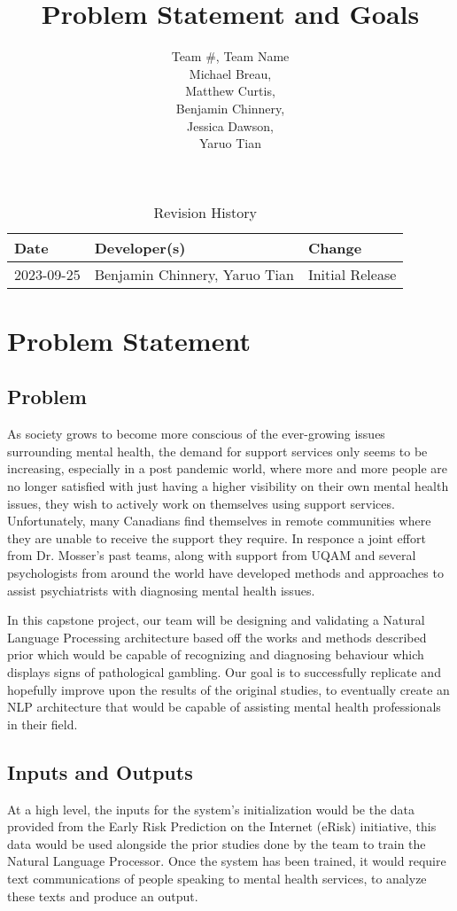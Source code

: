 \documentclass{article}
\title{Problem Statement and Goals\\\progname}
\author{Team \#, Team Name 
\\Michael Breau, \\Matthew Curtis, \\Benjamin Chinnery, \\Jessica Dawson, \\Yaruo Tian}
\date{}
\begin{document}
\maketitle

\begin{table}[hp]
\caption{Revision History} \label{TblRevisionHistory}
\begin{tabularx}{\textwidth}{llX}
\toprule
\textbf{Date} & \textbf{Developer(s)} & \textbf{Change}\\
\midrule
2023-09-25 &  Benjamin Chinnery, Yaruo Tian & Initial Release\\
\bottomrule
\end{tabularx}
\end{table}

\section{Problem Statement}

\subsection{Problem}
As society grows to become more conscious of the ever-growing issues surrounding mental health, the demand for support services only seems to be increasing, especially in a post pandemic world, where more and more people are no longer satisfied with just having a higher visibility on their own mental health issues, they wish to actively work on themselves using support services. Unfortunately, many Canadians find themselves in remote communities where they are unable to receive the support they require. In responce a joint effort from Dr. Mosser's past teams, along with support from UQAM and several psychologists from around the world have developed methods and approaches to assist psychiatrists with diagnosing mental health issues.

In this capstone project, our team will be designing and validating a Natural Language Processing architecture based off the works and methods described prior which would be capable of recognizing and diagnosing behaviour which displays signs of pathological gambling. Our goal is to successfully replicate and hopefully improve upon the results of the original studies, to eventually create an NLP architecture that would be capable of assisting mental health professionals in their field.

\subsection{Inputs and Outputs}
At a high level, the inputs for the system's initialization would be the data provided from the Early Risk Prediction on the Internet (eRisk) initiative, this data would be used alongside the prior studies done by the team to train the Natural Language Processor. Once the system has been trained, it would require text communications of people speaking to mental health services, to analyze these texts and produce an output.
\end{document}
